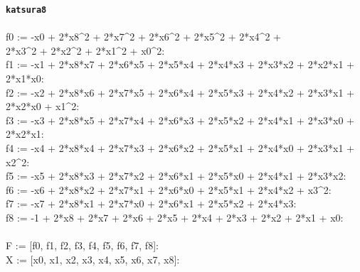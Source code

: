 \documentclass[letterpaper,12pt,titlepage,oneside,final]{book}
\newenvironment{codefont}{\footnotesize\ttfamily}{\par}
\begin{document}
\begin{appendices}
\noindent\textbf{\texttt{katsura8}}\\\\
\noindent\begin{codefont}
 f0 := -x0 + 2*x8\^{}2 + 2*x7\^{}2 + 2*x6\^{}2 + 2*x5\^{}2 + 2*x4\^{}2 + \\2*x3\^{}2 + 2*x2\^{}2 + 2*x1\^{}2 + x0\^{}2:\\
f1 := -x1 + 2*x8*x7 + 2*x6*x5 + 2*x5*x4 + 2*x4*x3 + 2*x3*x2 + 2*x2*x1 + 2*x1*x0:\\
f2 := -x2 + 2*x8*x6 + 2*x7*x5 + 2*x6*x4 + 2*x5*x3 + 2*x4*x2 + 2*x3*x1 + \\2*x2*x0 + x1\^{}2:\\
f3 := -x3 + 2*x8*x5 + 2*x7*x4 + 2*x6*x3 + 2*x5*x2 + 2*x4*x1 + 2*x3*x0 + 2*x2*x1:\\
f4 := -x4 + 2*x8*x4 + 2*x7*x3 + 2*x6*x2 + 2*x5*x1 + 2*x4*x0 + 2*x3*x1 + x2\^{}2:\\
f5 := -x5 + 2*x8*x3 + 2*x7*x2 + 2*x6*x1 + 2*x5*x0 + 2*x4*x1 + 2*x3*x2:\\
f6 := -x6 + 2*x8*x2 + 2*x7*x1 + 2*x6*x0 + 2*x5*x1 + 2*x4*x2 + x3\^{}2:\\
f7 := -x7 + 2*x8*x1 + 2*x7*x0 + 2*x6*x1 + 2*x5*x2 + 2*x4*x3:\\
f8 := -1 + 2*x8 + 2*x7 + 2*x6 + 2*x5 + 2*x4 + 2*x3 + 2*x2 + 2*x1 + x0:\\
\\
F := [f0, f1, f2, f3, f4, f5, f6, f7, f8]:\\
X := [x0, x1, x2, x3, x4, x5, x6, x7, x8]:\\
\end{codefont}


\end{appendices}
\end{document}
